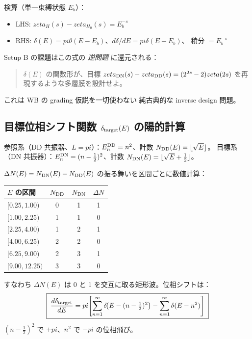\documentclass[11pt,a4paper]{article}
\def\pi{pi}%
\def\zeta{zeta}%
\def\textbf#1{#1}%
\begin{document}
検算（単一束縛状態 $E_b$）：
\begin{itemize}
\item LHS: $\zeta_H(s) - \zeta_{H_0}(s) = E_b^{-s}$
\item RHS: $\delta(E) = \pi\theta(E-E_b)$、$d\delta/dE = \pi\delta(E-E_b)$、
  積分 $= E_b^{-s}$ \checkmark
\end{itemize}

\textbf{Setup B の課題はこの式の \emph{逆問題} に還元される}：
\begin{quote}
$\delta(E)$ の関数形が、目標 $\zeta_{\rm DN}(s) - \zeta_{\rm DD}(s) = (2^{2s}-2)\zeta(2s)$
を再現するような多層膜を設計せよ。
\end{quote}

これは WB の grading 仮説を一切使わない \textbf{純古典的な inverse design 問題}。

\subsection{目標位相シフト関数 $\delta_{\rm target}(E)$ の陽的計算}

参照系（DD 共振器、$L=\pi$）：$E_n^{\rm DD} = n^2$、計数 $N_{\rm DD}(E) = \lfloor\sqrt E\rfloor$。
目標系（DN 共振器）：$E_n^{\rm DN} = (n-\tfrac12)^2$、計数 $N_{\rm DN}(E) = \lfloor\sqrt E + \tfrac12\rfloor$。

$\Delta N(E) = N_{\rm DN}(E) - N_{\rm DD}(E)$ の振る舞いを区間ごとに数値計算：

\begin{center}
\begin{tabular}{lccc}
\toprule
$E$ の区間 & $N_{\rm DD}$ & $N_{\rm DN}$ & $\Delta N$ \\
\midrule
$[0.25, 1.00)$  & 0 & 1 & 1 \\
$[1.00, 2.25)$  & 1 & 1 & 0 \\
$[2.25, 4.00)$  & 1 & 2 & 1 \\
$[4.00, 6.25)$  & 2 & 2 & 0 \\
$[6.25, 9.00)$  & 2 & 3 & 1 \\
$[9.00, 12.25)$ & 3 & 3 & 0 \\
\bottomrule
\end{tabular}
\end{center}

すなわち $\Delta N(E)$ は 0 と 1 を交互に取る矩形波。位相シフトは：
\[
  \boxed{\;
  \frac{d\delta_{\rm target}}{dE}
  = \pi\!\left[\sum_{n=1}^\infty \delta\!\bigl(E - (n-\tfrac12)^2\bigr)
            - \sum_{n=1}^\infty \delta(E - n^2)\right]\;}
\]
$(n-\tfrac12)^2$ で $+\pi$、$n^2$ で $-\pi$ の位相飛び。
\end{document}
